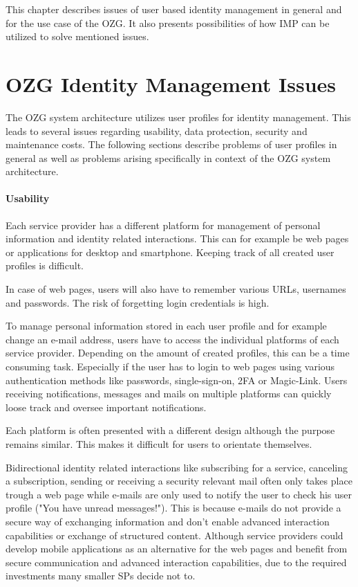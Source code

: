 This chapter describes issues of user based identity management in general and for the use case of the OZG. It also presents possibilities of how IMP can be utilized to solve mentioned issues.

\section{OZG Identity Management Issues}

The OZG system architecture utilizes user profiles for identity management. This leads to several issues regarding usability, data protection, security and maintenance costs. The following sections describe problems of user profiles in general as well as problems arising specifically in context of the OZG system architecture.

\paragraph{Usability}
Each service provider has a different platform for management of personal information and identity related interactions. This can for example be web pages or applications for desktop and smartphone. Keeping track of all created user profiles is difficult.

In case of web pages, users will also have to remember various URLs, usernames and passwords. The risk of forgetting login credentials is high.

To manage personal information stored in each user profile and for example change an e-mail address, users have to access the individual platforms of each service provider. Depending on the amount of created profiles, this can be a time consuming task. Especially if the user has to login to web pages using various authentication methods like passwords, single-sign-on, 2FA or Magic-Link. Users receiving notifications, messages and mails on multiple platforms can quickly loose track and oversee important notifications.

Each platform is often presented with a different design although the purpose remains similar. This makes it difficult for users to orientate themselves.

Bidirectional identity related interactions like subscribing for a service, canceling a subscription, sending or receiving a security relevant mail often only takes place trough a web page while e-mails are only used to notify the user to check his user profile ("You have unread messages!"). This is because e-mails do not provide a secure way of exchanging information and don't enable advanced interaction capabilities or exchange of structured content. Although service providers could develop mobile applications as an alternative for the web pages and benefit from secure communication and advanced interaction capabilities, due to the required investments many smaller SPs decide not to.

